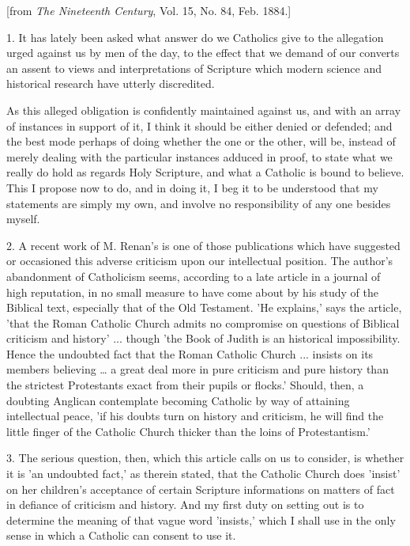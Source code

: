 
[from \emph{The
Nineteenth Century}, Vol. 15, No. 84, Feb. 1884.]

1. It has lately been asked what answer do
we Catholics give to the allegation urged against us by men of the
day, to the effect that we demand of our converts an assent to views
and interpretations of Scripture which modern science and historical
research have utterly discredited.

As this alleged obligation is confidently
maintained against us, and with an array of instances in support of
it, I think it should be either denied or defended; and the best mode
perhaps of doing whether the one or the other, will be, instead of
merely dealing with the particular instances adduced in proof, to
state what we really do hold as regards Holy Scripture, and what a
Catholic is bound to believe. This I propose now to do, and in doing
it, I beg it to be understood that my statements are simply my own,
and involve no responsibility of any one besides myself.

2. A recent work of M. Renan's is one of those
publications which have suggested or occasioned this adverse criticism
upon our intellectual position. The author's abandonment of
Catholicism seems, according to a late article in a journal of high
reputation, in no small measure to have come about by his study of the
Biblical text, especially that of the Old Testament. 'He explains,'
says the article, 'that the Roman Catholic Church admits no compromise
on questions of Biblical criticism and history' ... though 'the Book
of Judith is an historical impossibility. Hence the undoubted fact
that the Roman Catholic Church ... insists on its members believing
… a great deal more in pure criticism and pure history than the
strictest Protestants exact from their pupils or flocks.' Should,
then, a doubting Anglican contemplate becoming Catholic by way
of attaining intellectual peace, 'if his doubts turn on history and
criticism, he will find the little finger of the Catholic Church
thicker than the loins of Protestantism.'

3. The serious question, then, which this article
calls on us to consider, is whether it is 'an undoubted fact,' as
therein stated, that the Catholic Church does 'insist' on her children's
acceptance of certain Scripture informations on matters of fact in
defiance of criticism and history. And my first duty on setting out is
to determine the meaning of that vague word 'insists,' which I shall
use in the only sense in which a Catholic can consent to use it.

